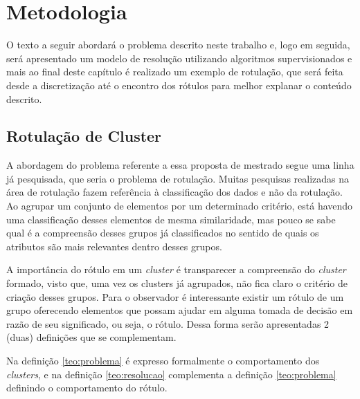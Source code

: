\chapter{Metodologia} \label{cap:ferramentas}

O texto a seguir abordará o problema descrito neste trabalho e, logo em seguida, será apresentado um modelo de resolução utilizando algoritmos supervisionados e mais ao final deste capítulo é realizado um exemplo de rotulação, que será feita desde a discretização até o encontro dos rótulos para melhor explanar o conteúdo descrito. 

\section{Rotulação de Cluster}\label{cap:ferramentas:sec:considproblema}

A abordagem do problema referente a essa proposta de mestrado segue uma linha já pesquisada, que seria o problema de rotulação. Muitas pesquisas realizadas na área de rotulação fazem referência à classificação dos dados e não da rotulação. Ao agrupar um conjunto de elementos por um determinado critério, está havendo uma classificação desses elementos de mesma similaridade, mas pouco se sabe qual é a compreensão desses grupos já classificados no sentido de quais os atributos são mais relevantes dentro desses grupos. 

A importância do rótulo em um \textit{cluster} é transparecer a compreensão do \textit{cluster} formado, visto que, uma vez os clusters já agrupados, não fica claro o critério de criação desses grupos. Para o observador é interessante existir um rótulo de um grupo oferecendo elementos que possam ajudar em alguma tomada de decisão em razão de seu significado, ou seja, o rótulo. Dessa forma serão apresentadas 2 (duas) definições que se complementam. 

Na definição \ref{teo:problema} é expresso formalmente o comportamento dos \textit{clusters}, e na definição \ref{teo:resolucao} complementa a definição \ref{teo:problema} definindo o comportamento do rótulo.

